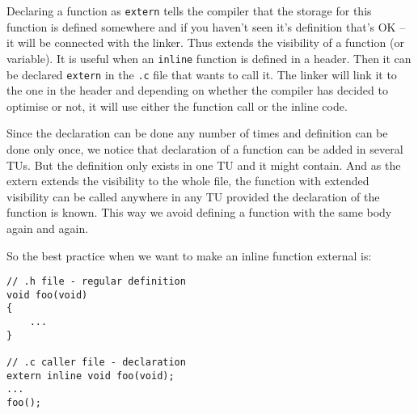 \documentclass[a4paper]{article}
\begin{document}
Declaring a function as \texttt{extern} tells the compiler that the storage for this function is defined somewhere and if you haven't seen it's definition that's OK -- it will be connected with the linker. Thus extends the visibility of a function (or variable). It is useful when an \texttt{inline} function is defined in a header. Then it can be declared  \texttt{extern} in the \texttt{.c} file that wants to call it. The linker will link it to the one in the header and depending on whether the compiler has decided to optimise or not, it will use either the function call or the inline code. 

Since the declaration can be done any number of times and definition can be done only once, we notice that declaration of a function can be added in several TUs. But the definition only exists in one TU and it might contain. And as the extern extends the visibility to the whole file, the function with extended visibility can be called anywhere in any TU provided the declaration of the function is known. This way we avoid defining a function with the same body again and again. 
\begin{takeaway}
So the best practice when we want to make an inline function external is:
\begin{verbatim}
// .h file - regular definition
void foo(void)
{
    ...
}

// .c caller file - declaration
extern inline void foo(void);
...
foo();
\end{verbatim}
\end{takeaway}
\end{document}
